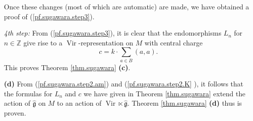\documentclass[etingof-lie.tex]{subfiles}
\begin{document}
Once these changes (most of which are automatic) are made, we have obtained a
proof of (\ref{pf.sugawara.step3}).

\textit{4th step:} From (\ref{pf.sugawara.step3}), it is clear that the
endomorphisms $L_{n}$ for $n\in\mathbb{Z}$ give rise to a $\operatorname*{Vir}%
$-representation on $M$ with central charge%
\[
c=k\cdot\sum\limits_{a\in B}\left(  a,a\right)  .
\]
This proves Theorem \ref{thm.sugawara} \textbf{(c)}.

\textbf{(d)} From (\ref{pf.sugawara.step2.am}) and (\ref{pf.sugawara.step2.K}%
), it follows that the formulas for $L_{n}$ and $c$ we have given in Theorem
\ref{thm.sugawara} extend the action of $\widehat{\mathfrak{g}}$ on $M$ to an
action of $\operatorname*{Vir}\ltimes\widehat{\mathfrak{g}}$. Theorem
\ref{thm.sugawara} \textbf{(d)} thus is proven.
\end{document}
